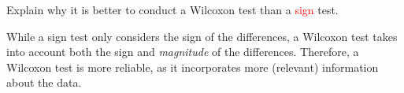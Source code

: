 \documentclass[../Notes.tex]{subfiles}
\begin{document}
\begin{note}
  \hypertarget{wilcoxson>sign}{}
  Explain why it is better to conduct a \textcolor{green!70!black}{Wilcoxon} test than a \textcolor{red}{sign} test.
  \begin{center}
    \parbox{0.9\textwidth}{
     While a sign test only considers the sign of the differences, a Wilcoxon test takes into account both the sign and \emph{magnitude} of the differences. Therefore, a Wilcoxon test is more reliable, as it incorporates more (relevant) information about the data.
    }
  \end{center}
      
\end{note}
      
\end{document}
